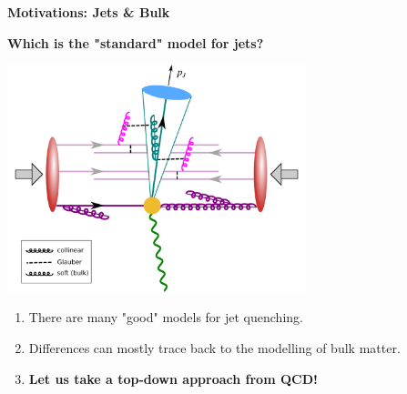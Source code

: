 \documentclass[9pt,a4paper,unknownkeysallowed,xcolor=dvipsnames,aspectratio=43]{beamer}
\begin{document}
{
\begin{frame}
%
\vspace{4mm}
\titlepage
\end{frame}
}
%
%
\setcounter{page}{0}
\begin{frame}
\vspace*{\fill}
\begin{center}
{\Huge\bf\color{gray} Motivations: Jets \& Bulk}
\end{center}
\vspace*{\fill}
\end{frame}
%
%
\begin{frame}{\bf\huge Which is the "standard" model for jets?}
\vspace{2mm}
\begin{center}
\includegraphics[width=0.65\textwidth]{fig/AA}\\
\end{center}
\vspace{2mm}
\begin{enumerate}
\item{\large There are many "good" models for jet quenching.}
\vspace{4mm}
\item{\large Differences can mostly trace back to the modelling of  bulk matter.}
\vspace{4mm}
\item{\large\bf\color{darkred} Let us take a top-down approach from QCD!}
\end{enumerate}
\end{frame}
\end{document}

